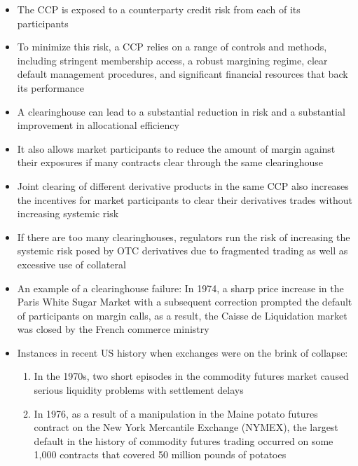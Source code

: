 \documentclass[11pt]{beamer}
\begin{document}
\begin{frame}
\begin{itemize}
\item The CCP is exposed to a counterparty credit risk from each of its participants
\item To minimize this risk, a CCP relies on a range of controls and methods, including stringent membership access, a robust margining regime, clear default management procedures, and significant financial resources that back its performance
\item A clearinghouse can lead to a substantial reduction in risk and
a substantial improvement in allocational efficiency
\item It also allows market participants to reduce the amount of margin against their exposures if many contracts clear through the same clearinghouse
\item Joint clearing of different derivative products in the same CCP also increases the incentives for market participants to clear their derivatives trades without increasing systemic risk
\item If there are too many clearinghouses, regulators run the risk of increasing the systemic risk posed by OTC derivatives due to fragmented trading as well as excessive use of collateral
\end{itemize}
\end{frame}

\begin{frame}
\begin{itemize}
\item An example of a clearinghouse failure: In 1974, a sharp price increase in the Paris White Sugar Market with a subsequent correction prompted the default of participants on margin calls, as a result, the Caisse de Liquidation market was closed by the French commerce ministry
\item Instances in recent US history when exchanges were on the brink of collapse:
\begin{enumerate}
\item In the 1970s, two short episodes in the commodity futures market caused serious liquidity problems with settlement delays
\item In 1976, as a result of a manipulation in the Maine potato futures contract on the New York Mercantile Exchange (NYMEX), the largest default in the history of commodity futures trading occurred on some 1,000 contracts that covered 50 million pounds of potatoes
\end{enumerate}
\end{itemize}
\end{frame}
\end{document}
